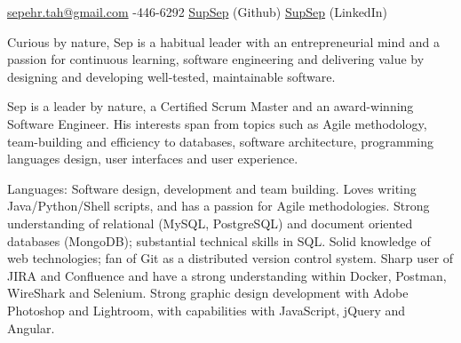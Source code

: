 \documentclass[10pt,a4paper]{article}
\begin{document}
\sloppy  %


\nobreakvspace{0.3em}  %

\noindent\href{mailto:sepehr.tah.at.gmail.dot.com}{sepehr.tah\mbox{}@\mbox{}gmail.com}\sbull
{}-446-6292\sbull
\href{https://github.com/supsep}{SupSep} (Github) \sbull
\href{http://www.linkedin.com/in/supsep}{SupSep} (LinkedIn) 


\spacedhrule{0.9em}{-0.4em}  %


\vspace{-1.3em}  %
\begin{multicols}{2}  %
Curious by nature, Sep is a habitual leader with an entrepreneurial
mind and a passion for continuous learning, software engineering and delivering value
by designing and developing well-tested, maintainable software.

Sep is a leader by nature, a Certified Scrum Master and an award-winning Software Engineer. His interests span from topics such as Agile methodology, team-building and efficiency to databases, software architecture, programming languages design, user interfaces and user experience.

\end{multicols}

\spacedhrule{0.5em}{-0.4em}

\inlineheadsection  %
  {Languages:}
  {Software design, development and team building. Loves writing 
Java/\nsp Python/\nsp Shell scripts, and has a passion for Agile methodologies. Strong understanding of relational
(MySQL, PostgreSQL) and document oriented databases (MongoDB); substantial technical skills in SQL. Solid knowledge of web technologies; fan of Git as a distributed version control system. Sharp user of JIRA and Confluence and have a strong understanding within Docker, Postman, WireShark and Selenium. Strong graphic design development with Adobe Photoshop and Lightroom, with capabilities with JavaScript, jQuery and Angular.}
\end{document}
